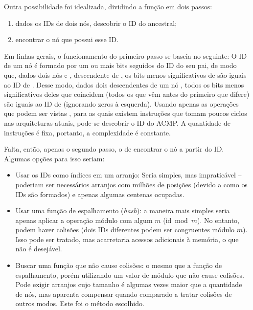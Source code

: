 Outra possibilidade foi idealizada, dividindo a função \ACMPIDs em dois passos:
\begin{enumerate}
	\item dados os IDs de dois nós, descobrir o ID do ancestral;
	\item encontrar o nó que possui esse ID.
\end{enumerate}
Em linhas gerais, o funcionamento do primeiro passo se baseia no seguinte:
O ID de um nó é formado por um ou mais bits seguidos do ID do seu pai, de modo que, dados dois nós  e ,  descendente de ,
os bits menos significativos de  são iguais ao ID de .
Desse modo, dados dois descendentes de um nó , todos os bits menos significativos deles que coincidem
(todos os que vêm antes do primeiro que difere) são iguais ao ID de  (ignorando zeros à esquerda).
Usando apenas as operações que podem ser vistas ,
para as quais existem instruções que tomam poucos ciclos nas arquiteturas atuais, pode-se descobrir o ID do ACMP.
A quantidade de instruções é fixa, portanto, a complexidade é constante.



Falta, então, apenas o segundo passo, o de encontrar o nó a partir do ID.
Algumas opções para isso seriam:
\begin{itemize}
	\item Usar os IDs como índices em um arranjo: Seria simples, mas impraticável -- poderiam ser necessários arranjos com milhões de posições (devido a como os IDs são formados) e apenas algumas centenas ocupadas.
	\item Usar uma função de espalhamento (\textit{hash}): a maneira mais simples seria apenas aplicar a operação módulo com algum $m$ ($\mathrm{id} \bmod m$).
	No entanto, podem haver colisões (dois IDs diferentes podem ser congruentes módulo $m$).
	Isso pode ser tratado, mas acarretaria acessos adicionais à memória, o que não é desejável.
	\item Buscar uma função que não cause colisões: o mesmo que a função de espalhamento, porém utilizando um valor de módulo que não cause colisões.
	Pode exigir arranjos cujo tamanho é algumas vezes maior que a quantidade de nós, mas aparenta compensar quando comparado a tratar colisões de outros modos.
	Este foi o método escolhido.
\end{itemize}

